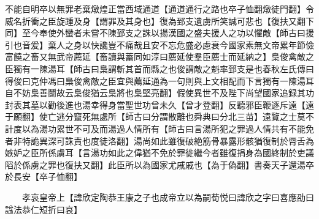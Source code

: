 不能自明卒以無罪老棄燉煌正當西域通道【通道通行之路也卒子恤翻燉徒門翻】令威名折衝之臣旋踵及身【謂罪及其身也】復為郅支遺虜所笑誠可悲也【復扶又翻下同】至今奉使外蠻者未嘗不陳郅支之誅以揚漢國之盛夫援人之功以懼敵【師古曰援引也音爰】棄人之身以快讒豈不痛哉且安不忘危盛必慮衰今國家素無文帝累年節儉富饒之畜又無武帝薦延【畜讀與蓄同如淳曰薦延使羣臣薦士而延納之】梟俊禽敵之臣獨有一陳湯耳【師古曰梟謂斬其首而縣之也俊謂敵之魁率郅支是也春秋左氏傳曰得俊曰克仲馮曰梟俊禽敵之臣宜與薦延通為一句則與上文相配而下言獨有一陳湯耳自不妨梟善鬬故云梟俊猶云梟將也梟堅亮翻】假使異世不及陛下尚望國家追録其功封表其墓以勸後進也湯幸得身當聖世功曾未久【曾才登翻】反聽邪臣鞭逐斥遠【遠于願翻】使亡逃分竄死無處所【師古曰分謂散離也舜典曰分北三苗】遠覽之士莫不計度以為湯功累世不可及而湯過人情所有【師古曰言湯所犯之罪過人情共有不能免者非特詭異深可誅責也度徒洛翻】湯尚如此雖復破絶筋骨暴露形骸猶復制於脣舌為嫉妒之臣所係虜耳【言湯功如此之偉猶不免於罪徙繼今者雖復捐身為國終制於吏議䧟於係虜之罪也復扶又翻】此臣所以為國家尤戚戚也【為于偽翻】書奏天子還湯卒於長安【卒子恤翻】

　　孝哀皇帝上【諱欣定陶恭王康之子也成帝立以為嗣荀悦曰諱欣之字曰喜應劭曰諡法恭仁短折曰哀】

